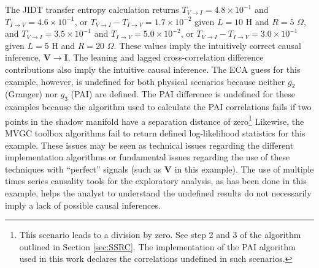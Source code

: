 The JIDT transfer entropy calculation returns $T_{V\rightarrow I}=4.8\times 10^{-1}$ and $T_{I\rightarrow V}=4.6\times 10^{-1}$, or $T_{V\rightarrow I}-T_{I\rightarrow V}=1.7\times 10^{-2}$ given $L=10$ H and $R=5$ $\Omega$, and $T_{V\rightarrow I}=3.5\times 10^{-1}$ and $T_{I\rightarrow V}=5.0\times 10^{-2}$, or $T_{V\rightarrow I}-T_{I\rightarrow V}=3.0\times 10^{-1}$ given $L=5$ H and $R=20$ $\Omega$.  These values imply the intuitively correct causal inference, $\mathbf{V}\rightarrow\mathbf{I}$.  The leaning and lagged cross-correlation difference contributions also imply the intuitive causal inference.  The ECA guess for this example, however, is undefined for both physical scenarios because neither $g_2$ (Granger) nor $g_3$ (PAI) are defined.  The PAI difference is undefined for these examples because the algorithm used to calculate the PAI correlations fails if two points in the shadow manifold have a separation distance of zero\footnote{This scenario leads to a division by zero.  See step 2 and 3 of the algorithm outlined in Section \ref{sec:SSRC}.  The implementation of the PAI algorithm used in this work declares the correlations undefined in such scenarios.}  Likewise, the MVGC toolbox algorithms fail to return defined log-likelihood statistics for this example.  These issues may be seen as technical issues regarding the different implementation algorithms or fundamental issues regarding the use of these techniques with ``perfect'' signals (such as $\mathbf{V}$ in this example).  The use of multiple times series causality tools for the exploratory analysis, as has been done in this example, helps the analyst to understand the undefined results do not necessarily imply a lack of possible causal inferences.  

